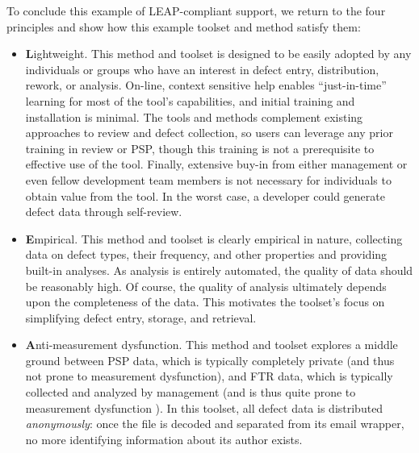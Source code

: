 To conclude this example of LEAP-compliant support, we return to the four
principles and show how this example toolset and method satisfy them:

\begin{itemize}
  
\item {\bf L}ightweight.  This method and toolset is designed to be easily
  adopted by any individuals or groups who have an interest in defect
  entry, distribution, rework, or analysis. On-line, context sensitive help
  enables ``just-in-time'' learning for most of the tool's capabilities,
  and initial training and installation is minimal. The tools and methods
  complement existing approaches to review and defect collection, so users
  can leverage any prior training in review or PSP, though this training is
  not a prerequisite to effective use of the tool. Finally, extensive
  buy-in from either management or even fellow development team members is
  not necessary for individuals to obtain value from the tool. In the 
  worst case, a developer could generate defect data through self-review.

  
\item {\bf E}mpirical. This method and toolset is clearly empirical in
  nature, collecting data on defect types, their frequency, and other
  properties and providing built-in analyses.  As analysis is entirely
  automated, the quality of data should be reasonably high. Of course, the
  quality of analysis ultimately depends upon the completeness of the
  data. This motivates the toolset's focus on simplifying defect entry,
  storage, and retrieval.

  
\item {\bf A}nti-measurement dysfunction.  This method and toolset explores
  a middle ground between PSP data, which is typically completely private
  (and thus not prone to measurement dysfunction), and FTR data, which is
  typically collected and analyzed by management (and is thus quite prone to
  measurement dysfunction \cite{csdl-96-16}). In this toolset, all defect
  data is distributed {\em anonymously}: once the file is decoded and
  separated from its email wrapper, no more identifying information about
  its author exists.
  

\end{itemize}

